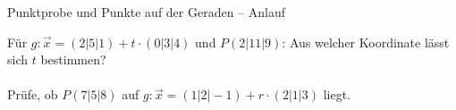 \setcounter{aufgabe}{0}

\begin{aufgabe}{Punktprobe und Punkte auf der Geraden – Anlauf}
\begin{teile}
\teil Für $g\colon \vec x = (2 | 5 | 1) + t \cdot (0 | 3 | 4)$ und $P(2 | 11 | 9)$: Aus welcher Koordinate lässt sich $t$ bestimmen?  \\  \\ 
\teil Prüfe, ob $P(7 | 5 | 8)$ auf $g\colon \vec x = (1 | 2 | -1) + r \cdot (2 | 1 | 3)$ liegt.
\end{teile}
\end{aufgabe}

